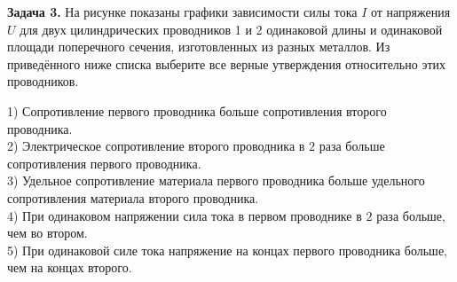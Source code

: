 \begin{taskbasic}[code={\label{task:elem_ohm_v17_n15}}]
\textbf{Задача 3.} На рисунке показаны графики зависимости силы тока $I$ от напряжения $U$ для двух цилиндрических проводников 1 и 2 одинаковой длины и одинаковой площади поперечного сечения, изготовленных из разных металлов. Из приведённого ниже списка выберите все верные утверждения относительно этих проводников.

\nopagebreak\smallskip
\begin{center}
\end{center}

1) Сопротивление первого проводника больше сопротивления второго проводника.\\
2) Электрическое сопротивление второго проводника в $2$ раза больше сопротивления первого проводника.\\
3) Удельное сопротивление материала первого проводника больше удельного сопротивления материала второго проводника.\\
4) При одинаковом напряжении сила тока в первом проводнике в $2$ раза больше, чем во втором.\\
5) При одинаковой силе тока напряжение на концах первого проводника больше, чем на концах второго.

\end{taskbasic}

